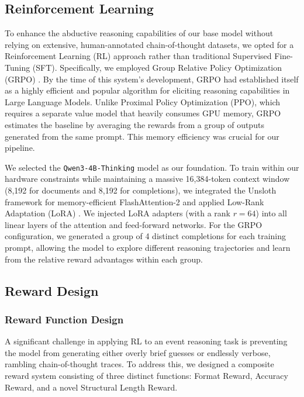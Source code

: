 \documentclass{article}
\begin{document}
\subsection{Reinforcement Learning}

To enhance the abductive reasoning capabilities of our base model without relying on extensive, human-annotated chain-of-thought datasets, we opted for a Reinforcement Learning (RL) approach rather than traditional Supervised Fine-Tuning (SFT). Specifically, we employed Group Relative Policy Optimization (GRPO) \cite{shao2024deepseekmath}. By the time of this system's development, GRPO had established itself as a highly efficient and popular algorithm for eliciting reasoning capabilities in Large Language Models. Unlike Proximal Policy Optimization (PPO), which requires a separate value model that heavily consumes GPU memory, GRPO estimates the baseline by averaging the rewards from a group of outputs generated from the same prompt. This memory efficiency was crucial for our pipeline.

We selected the \texttt{Qwen3-4B-Thinking} model as our foundation. To train within our hardware constraints while maintaining a massive 16,384-token context window (8,192 for documents and 8,192 for completions), we integrated the Unsloth framework for memory-efficient FlashAttention-2 and applied Low-Rank Adaptation (LoRA) \cite{hu2021lora}. We injected LoRA adapters (with a rank $r=64$) into all linear layers of the attention and feed-forward networks. For the GRPO configuration, we generated a group of 4 distinct completions for each training prompt, allowing the model to explore different reasoning trajectories and learn from the relative reward advantages within each group.

\subsection{Reward Design}

\subsubsection{Reward Function Design}

A significant challenge in applying RL to an event reasoning task is preventing the model from generating either overly brief guesses or endlessly verbose, rambling chain-of-thought traces. To address this, we designed a composite reward system consisting of three distinct functions: Format Reward, Accuracy Reward, and a novel Structural Length Reward.
\end{document}

